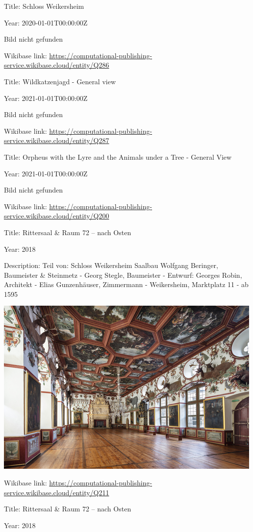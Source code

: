 \documentclass[
  letterpaper,
]{book}
\begin{document}
Title: Schloss Weikersheim

Year: 2020-01-01T00:00:00Z

Bild nicht gefunden

Wikibase link:
\url{https://computational-publishing-service.wikibase.cloud/entity/Q286}

Title: Wildkatzenjagd - General view

Year: 2021-01-01T00:00:00Z

Bild nicht gefunden

Wikibase link:
\url{https://computational-publishing-service.wikibase.cloud/entity/Q287}

Title: Orpheus with the Lyre and the Animals under a Tree - General View

Year: 2021-01-01T00:00:00Z

Bild nicht gefunden

Wikibase link:
\url{https://computational-publishing-service.wikibase.cloud/entity/Q200}

Title: Rittersaal \& Raum 72 -- nach Osten

Year: 2018

Description: Teil von: Schloss Weikersheim Saalbau Wolfgang Beringer,
Baumeister \& Steinmetz - Georg Stegle, Baumeister - Entwurf: Georges
Robin, Architekt - Elias Gunzenhäuser, Zimmermann - Weikersheim,
Marktplatz 11 - ab 1595

\includegraphics{paintings_files/figure-pdf/cell-3-output-114.png}

Wikibase link:
\url{https://computational-publishing-service.wikibase.cloud/entity/Q211}

Title: Rittersaal \& Raum 72 -- nach Osten

Year: 2018
\end{document}
